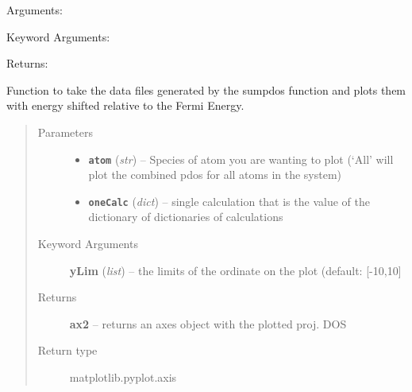 \documentclass[letterpaper,10pt,english]{sphinxmanual}
\begin{document}

\begin{fulllineitems}
\label{plot:plot.__getPath_WanT}
Arguments:

Keyword Arguments:

Returns:

\end{fulllineitems}


\begin{fulllineitems}
\label{plot:plot.__plotByAtom}
Function to take the data files generated by the sumpdos function and
plots them with energy shifted relative to the Fermi Energy.
\begin{quote}\begin{description}
\item[{Parameters}] \leavevmode\begin{itemize}
\item {} 
\textbf{\texttt{atom}} (\emph{str}) -- Species of atom you are wanting to plot (`All' will
plot the combined pdos for all atoms in the system)

\item {} 
\textbf{\texttt{oneCalc}} (\emph{dict}) -- single calculation that is the value of the dictionary
of dictionaries of calculations

\end{itemize}

\item[{Keyword Arguments}] \leavevmode
\textbf{yLim} (\emph{list}) --
the limits of the ordinate on the plot (default: {[}-10,10{]}

\item[{Returns}] \leavevmode
\textbf{ax2} --
returns an axes object with the plotted proj. DOS

\item[{Return type}] \leavevmode
matplotlib.pyplot.axis

\end{description}\end{quote}

\end{fulllineitems}

\end{document}
